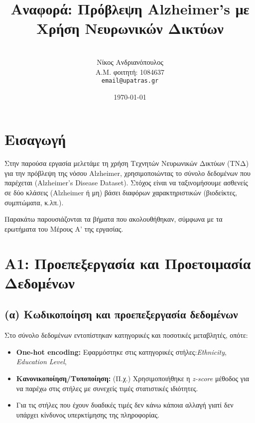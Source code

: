 \documentclass[a4paper,11pt]{article}
\begin{document}

\title{\textbf{Αναφορά: Πρόβλεψη Alzheimer’s με Χρήση Νευρωνικών Δικτύων}}
\author{\\
\large Νίκος Ανδριανόπουλος \\
\large Α.Μ. φοιτητή: 1084637 \\
\large \texttt{email@upatras.gr}
}
\date{\today}
\maketitle

\section{Εισαγωγή}
Στην παρούσα εργασία μελετάμε τη χρήση Τεχνητών Νευρωνικών Δικτύων (ΤΝΔ) για την
πρόβλεψη της νόσου Alzheimer, χρησιμοποιώντας το σύνολο δεδομένων που παρέχεται
(Alzheimer’s Disease Dataset). Στόχος είναι να ταξινομήσουμε ασθενείς σε δύο κλάσεις
(Alzheimer ή μη) βάσει διαφόρων χαρακτηριστικών (βιοδείκτες, συμπτώματα, κ.λπ.).

Παρακάτω παρουσιάζονται τα βήματα που ακολουθήθηκαν, σύμφωνα με τα ερωτήματα του
Μέρους Α’ της εργασίας.

\section{A1: Προεπεξεργασία και Προετοιμασία Δεδομένων}

\subsection{(α) Κωδικοποίηση και προεπεξεργασία δεδομένων}
Στο σύνολο δεδομένων εντοπίστηκαν κατηγορικές και ποσοτικές μεταβλητές, οπότε:
\begin{itemize}
    \item \textbf{One-hot encoding:} Εφαρμόστηκε στις κατηγορικές στήλες:\emph{Εthnicity}, \emph{Education Level}, 
    \item \textbf{Κανονικοποίηση/Τυποποίηση:} (Π.χ.) Χρησιμοποιήθηκε η \emph{z-score} μέθοδος για να παρέχω στις στήλες με συνεχείς τιμές στατιστικές ιδιότητες.
    \item Για τις στήλες που έχουν δυαδικές τιμές δεν κάνω κάποια αλλαγή γιατί δεν υπάρχει κίνδυνος υπερκτίμησης της πληροφορίας.
\end{itemize}
\end{document}
